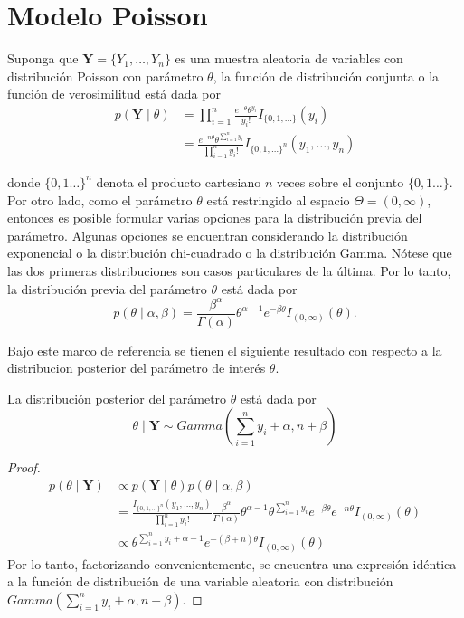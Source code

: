     \section{Modelo Poisson}
    
    Suponga que $\mathbf{Y}=\{Y_1,\ldots,Y_n\}$ es una muestra aleatoria de variables con distribuci\'on Poisson con par\'ametro $\theta$, la funci\'on de distribuci\'on conjunta o la funci\'on de verosimilitud est\'a dada por
    \begin{align*}
    p(\mathbf{Y} \mid \theta)&=\prod_{i=1}^n\frac{e^{-\theta}\theta^{y_i}}{y_i!}I_{\{0,1,\ldots\}}(y_i)\\
    &=\frac{e^{-n\theta}\theta^{\sum_{i=1}^ny_i}}{\prod_{i=1}^ny_i!}I_{\{0,1,\ldots\}^n}(y_1,\ldots,y_n)
    \end{align*}
    
    donde $\{0,1\ldots\}^n$ denota el producto cartesiano $n$ veces sobre el conjunto $\{0,1\ldots\}$. Por otro lado, como el par\'ametro $\theta$ est\'a restringido al espacio $\Theta=(0,\infty)$, entonces es posible formular varias opciones para la distribuci\'on previa del par\'ametro. Algunas opciones se encuentran considerando la distribuci\'on exponencial o la distribuci\'on chi-cuadrado o la distribuci\'on Gamma. N\'otese que las dos primeras distribuciones son casos particulares de la \'ultima. Por lo tanto, la distribuci\'on previa del par\'ametro $\theta$ est\'a dada por
    \begin{equation}
    p(\theta \mid \alpha,\beta)=\frac{\beta^\alpha}{\Gamma(\alpha)}\theta^{\alpha-1} e^{-\beta\theta}I_{(0,\infty)}(\theta).
    \end{equation}
    
    Bajo este marco de referencia se tienen el siguiente resultado con respecto a la distribucion posterior del par\'ametro de inter\'es $\theta$.
    \begin{Res}
    \label{ResPoissonPost}
    La distribuci\'on posterior del par\'ametro $\theta$ est\'a dada por
    \begin{equation*}
    \theta \mid \mathbf{Y} \sim Gamma\left(\sum_{i=1}^ny_i+\alpha,n+\beta\right)
    \end{equation*}
    \end{Res}
    
    \begin{proof}
    \begin{align*}
    p(\theta \mid \mathbf{Y})&\propto p(\mathbf{Y} \mid \theta)p(\theta \mid \alpha,\beta)\\
    &=\frac{I_{\{0,1,\ldots\}^n}(y_1,\ldots,y_n)}{\prod_{i=1}^ny_i!}\frac{\beta^\alpha}{\Gamma(\alpha)}
    \theta^{\alpha-1}\theta^{\sum_{i=1}^ny_i}e^{-\beta\theta}e^{-n\theta}I_{(0,\infty)}(\theta)\\
    &\propto \theta^{\sum_{i=1}^ny_i+\alpha-1}e^{-(\beta+n)\theta}I_{(0,\infty)}(\theta)
    \end{align*}
    Por lo tanto, factorizando convenientemente, se encuentra una expresi\'on id\'entica a la funci\'on de distribuci\'on de una variable aleatoria con distribuci\'on $Gamma(\sum_{i=1}^ny_i+\alpha,n+\beta)$.
    \end{proof}
    
